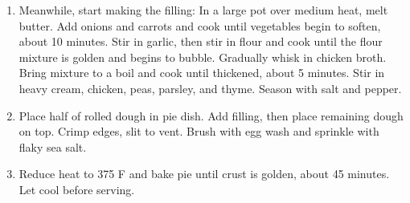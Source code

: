 \documentclass[11pt, twoside, openany]{book}
\begin{document}
\begin{minipage}[t]{\linewidth}
\begin{enumerate}
\item Meanwhile, start making the filling: In a large pot over medium heat, melt butter. Add onions and carrots and cook until vegetables begin to soften, about 10 minutes. Stir in garlic, then stir in flour and cook until the flour mixture is golden and begins to bubble. Gradually whisk in chicken broth. Bring mixture to a boil and cook until thickened, about 5 minutes. Stir in heavy cream, chicken, peas, parsley, and thyme. Season with salt and pepper.
\item Place half of rolled dough in pie dish. Add filling, then place remaining dough on top. Crimp edges, slit to vent. Brush with egg wash and sprinkle with flaky sea salt.
\item Reduce heat to 375 F and bake pie until crust is golden, about 45 minutes. Let cool before serving.
\end{enumerate}
\end{minipage}\vspace{8mm}
\end{document}
